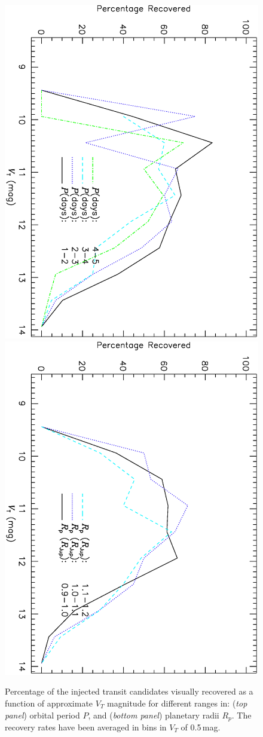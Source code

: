 \begin{figure}
\begin{center}
\centering
\includegraphics[width=.55\textwidth, angle=90]{7_visual_d}\\
\includegraphics[width=.55\textwidth, angle=90]{7_visual_e}\\
\caption[Visual-recovery rates for different periods and planetary radii]{%
Percentage of the injected transit candidates visually recovered as a function of approximate $V_{T}$ magnitude for different ranges in: %
({\it top panel}) orbital period $P$, and %
({\it bottom panel}) planetary radii $R_{p}$. %
The recovery rates have been averaged in bins in $V_{T}$ of 0.5\,mag.%
}
\label{cha:human:sec:model:fig:visrecrates1}
\end{center}
\end{figure}

